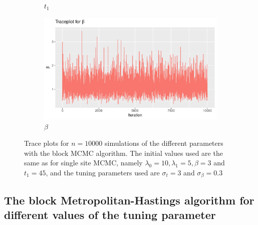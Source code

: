 \begin{figure}[h]
\begin{subfigure}[b]{0.49\textwidth}
        \caption{$t_1$}
        \label{fig:block_burnin_t}
    \end{subfigure}
    \begin{subfigure}[b]{0.49\textwidth}
        \centering
        \includegraphics[width = \textwidth]{Images/block_sim_beta.pdf}
        \caption{$\beta$}
        \label{fig:block_burnin_beta}
    \end{subfigure}
    \caption{Trace plots for $n = 10000$ simulations of the different parameters with the block MCMC algorithm. The initial values used are the same as for single site MCMC, namely $\lambda_0 = 10, \lambda_1 = 5, \beta = 3$ and $t_1 = 45$, and the tuning parameters used are $\sigma_t = 3$ and $\sigma_{\beta} = 0.3$}
    \label{fig:burnin_blockMH}
\end{figure}



\subsection{The block Metropolitan-Hastings algorithm for different values of the tuning parameter}


